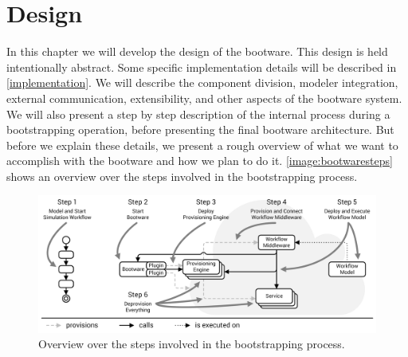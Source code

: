 \chapter{Design}
\label{design}

In this chapter we will develop the design of the bootware.
This design is held intentionally abstract.
Some specific implementation details will be described in \autoref{implementation}.
We will describe the component division, modeler integration, external communication, extensibility, and other aspects of the bootware system.
We will also present a step by step description of the internal process during a bootstrapping operation, before presenting the final bootware architecture.
But before we explain these details, we present a rough overview of what we want to accomplish with the bootware and how we plan to do it.
\autoref{image:bootwaresteps} shows an overview over the steps involved in the bootstrapping process.

\begin{figure}[!htbp]
	\centering
	\includegraphics[resolution=600]{design/assets/bootware_steps}
	\caption{Overview over the steps involved in the bootstrapping process.}
	\label{image:bootwaresteps}
\end{figure}

